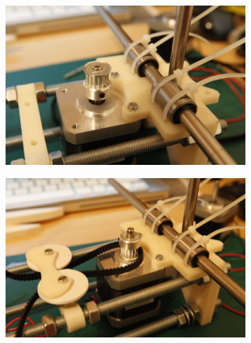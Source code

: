 		\begin{figure}[H]
		        \centering
		        \begin{subfigure}[htb]{0.5\textwidth}
		                \centering
		                \includegraphics[width=\textwidth]{../../Fotos/80.jpg}
		                \label{fig:14.z}
		        \end{subfigure}
		        \begin{subfigure}[htb]{0.5\textwidth}
		                \centering
		                \includegraphics[width=\textwidth]{../../Fotos/81.jpg}
		                \label{fig:15.z}
		        \end{subfigure}
		        \begin{subfigure}[htb]{0.5\textwidth}
		                \centering

\end{subfigure}
\end{figure}
